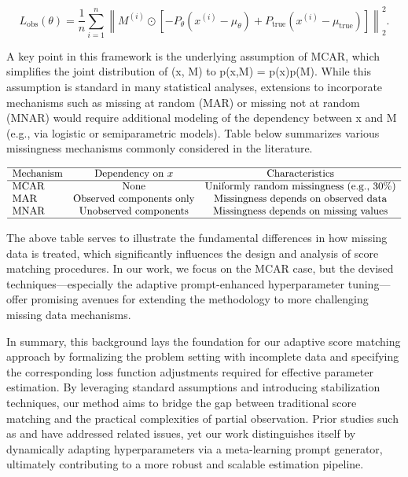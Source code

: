 \documentclass{article} %
\begin{document}
\[
L_{\mathrm{obs}}(\theta) = \frac{1}{n} \sum_{i=1}^n \left\| M^{(i)} \odot \left[-P_\theta (x^{(i)} - \mu_\theta) + P_{\mathrm{true}} (x^{(i)} - \mu_{\mathrm{true}})\right] \right\|_2^2.
\]

A key point in this framework is the underlying assumption of MCAR, which simplifies the joint distribution of (x, M) to p(x,M) = p(x)p(M). While this assumption is standard in many statistical analyses, extensions to incorporate mechanisms such as missing at random (MAR) or missing not at random (MNAR) would require additional modeling of the dependency between x and M (e.g., via logistic or semiparametric models). Table below summarizes various missingness mechanisms commonly considered in the literature.

\[
\begin{array}{lcc}
\hline
\text{Mechanism} & \text{Dependency on } x & \text{Characteristics} \\
\hline
\text{MCAR} & \text{None} & \text{Uniformly random missingness (e.g., 30\%)} \\
\text{MAR}  & \text{Observed components only} & \text{Missingness depends on observed data} \\
\text{MNAR} & \text{Unobserved components} & \text{Missingness depends on missing values} \\
\hline
\end{array}
\]

The above table serves to illustrate the fundamental differences in how missing data is treated, which significantly influences the design and analysis of score matching procedures. In our work, we focus on the MCAR case, but the devised techniques—especially the adaptive prompt-enhanced hyperparameter tuning—offer promising avenues for extending the methodology to more challenging missing data mechanisms.

In summary, this background lays the foundation for our adaptive score matching approach by formalizing the problem setting with incomplete data and specifying the corresponding loss function adjustments required for effective parameter estimation. By leveraging standard assumptions and introducing stabilization techniques, our method aims to bridge the gap between traditional score matching and the practical complexities of partial observation. Prior studies such as \cite{givens2025score} and \cite{wang2021score} have addressed related issues, yet our work distinguishes itself by dynamically adapting hyperparameters via a meta-learning prompt generator, ultimately contributing to a more robust and scalable estimation pipeline.
\end{document}
